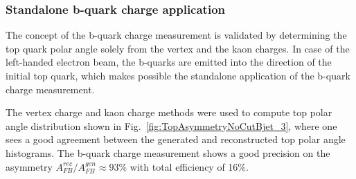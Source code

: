 \subsubsection{Standalone b-quark charge application}\label{sec:TopBCharge}
The concept of the b-quark charge measurement is validated by determining the top quark polar angle solely from the vertex and the kaon charges. 
In case of the left-handed electron beam, the b-quarks are emitted into the direction of the initial top quark, which makes possible the standalone application of the b-quark charge measurement. 

The vertex charge and kaon charge methods were used to compute top polar angle distribution shown in Fig.~\ref{fig:TopAsymmetryNoCutBjet_3}, where one sees a good agreement between the generated and reconstructed top polar angle histograms. 
The b-quark charge measurement shows a good precision on the asymmetry $A_{FB}^{rec}/A^{gen}_{FB} \approx 93\%$ with total efficiency of 16\%.

